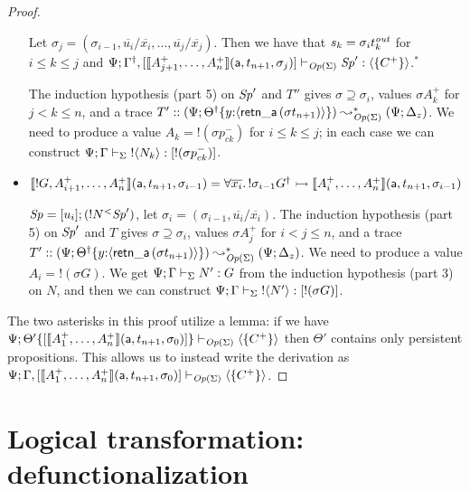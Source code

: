 \begin{proof}
\begin{itemize}
   \smallskip
    
   Let
   $\sigma_j = (\sigma_{i-1},
                   \overline{u_i}/\overline{x_i},\ldots,
                   \overline{u_j}/\overline{x_j})$.
   Then we have that $s_k = {\sigma_i}t^{\it out}_k$ for $i \leq k \leq j$ and
   ${\Psi}; {{{\Gamma}^\dag},[\llbracket {A^+_{j+1},\ldots,A^+_n} \rrbracket({\sf a},{t_{n+1}},{\sigma_{j}})]} \vdash_{{\it Op}({\Sigma})} {{\it Sp}'} : {\langle {\{ C^+ \}} \rangle}$.$^*$

  \smallskip

 The induction 
   hypothesis (part 5) on ${\it Sp}'$ and $T''$
  gives $\sigma \supseteq \sigma_{i}$, values
  $\sigma{A^+_{k}}$ for $j < k \leq n$, and 
  a trace $T' :: (\Psi; {{{\Theta}^\dag}}\{{y{:}\langle {{\sf retn\_a}\,(\sigma t_{n+1})} \rangle}\})
  \leadsto^*_{{\it Op}({\Sigma})}
 (\Psi; \Delta_z)$. We need to produce a value $A_k = {!}(\sigma{p^-_{ck}})$
  for $i \leq k \leq j$; in each case we can construct
  ${\Psi}; {\Gamma} \vdash_{\Sigma} {{!}{\langle {N_k} \rangle}} : {[{!}(\sigma{p^-_{ck}})]}$.
  \bigskip

\item $\llbracket {{!}G,A^+_{i+1},\ldots,A^+_n} \rrbracket({\sf a},{t_{n+1}},{\sigma_{i-1}}) = \forall
  \overline{x_i}.\, {!}\sigma_{i-1}{{G}^\dag} \rightarrowtail
  \llbracket {A^+_i,\ldots,A^+_n} \rrbracket({\sf a},{t_{n+1}},{\sigma_{i-1}})$

  \bigskip
  ${\it Sp} = [{u_i}]; {({{!}{N}}{^{<}}{{\it Sp}'})}$,
  let $\sigma_i = (\sigma_{i-1},\overline{u_i}/\overline{x_i})$.  The
  induction hypothesis (part 5) on ${\it Sp}'$ and $T$
  gives $\sigma \supseteq \sigma_{i}$, values
  $\sigma{A^+_{j}}$ for $i < j \leq n$, and 
  a trace $T' :: (\Psi; {{{\Theta}^\dag}}\{{y{:}\langle {{\sf retn\_a}\,(\sigma t_{n+1})} \rangle}\})
  \leadsto^*_{{\it Op}({\Sigma})}
 (\Psi; \Delta_z)$. We need to produce a value $A_i = {!}(\sigma{G})$. 
  We get 
  ${\Psi}; {\Gamma} \vdash_{\Sigma} {N'} : {G}$ from the induction hypothesis 
  (part 3) on $N$, and  
  then we can construct 
  ${\Psi}; {\Gamma} \vdash_{\Sigma} {{!}{\langle {N'} \rangle}} : {[{!}(\sigma{G})]}$.
\end{itemize}


The two asterisks in this proof utilize a lemma: if we have
${\Psi}; {{\Theta'}\{{[\llbracket {A_1^+,\ldots,A_n^+} \rrbracket({\sf a},{t_{n+1}},{\sigma_0})]}\}} \vdash_{{\it Op}({\Sigma})} {\langle {\{ C^+ \}} \rangle}$ then $\Theta'$ contains only 
persistent propositions. This allows us to
instead write the derivation as ${\Psi}; {\Gamma, 
{[\llbracket {A_1^+,\ldots,A_n^+} \rrbracket({\sf a},{t_{n+1}},{\sigma_0})]}} \vdash_{{\it Op}({\Sigma})} {\langle {\{ C^+ \}} \rangle}$.
\end{proof}


\section{Logical transformation: defunctionalization}
\label{sec:defunctionalization}

